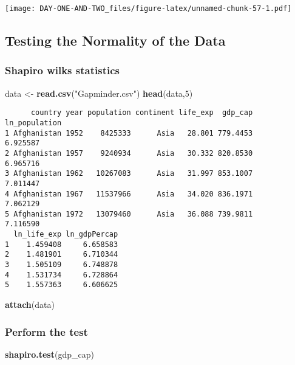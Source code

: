 \documentclass[
]{article}
\newenvironment{Shaded}{\begin{snugshade}}{\end{snugshade}}
\newcommand{\DecValTok}[1]{\textcolor[rgb]{0.00,0.00,0.81}{#1}}
\newcommand{\FunctionTok}[1]{\textcolor[rgb]{0.13,0.29,0.53}{\textbf{#1}}}
\newcommand{\NormalTok}[1]{#1}
\newcommand{\OtherTok}[1]{\textcolor[rgb]{0.56,0.35,0.01}{#1}}
\newcommand{\StringTok}[1]{\textcolor[rgb]{0.31,0.60,0.02}{#1}}
\begin{document}
\texttt{[image: DAY-ONE-AND-TWO\_files/figure-latex/unnamed-chunk-57-1.pdf]}

\hypertarget{testing-the-normality-of-the-data}{%
\subsection{Testing the Normality of the
Data}\label{testing-the-normality-of-the-data}}

\hypertarget{shapiro-wilks-statistics}{%
\subsubsection{Shapiro wilks
statistics}\label{shapiro-wilks-statistics}}

\begin{Shaded}
\begin{Highlighting}[]
\NormalTok{data }\OtherTok{\textless{}{-}} \FunctionTok{read.csv}\NormalTok{(}\StringTok{"Gapminder.csv"}\NormalTok{)}
\FunctionTok{head}\NormalTok{(data,}\DecValTok{5}\NormalTok{)}
\end{Highlighting}
\end{Shaded}

\begin{verbatim}
      country year population continent life_exp  gdp_cap ln_population
1 Afghanistan 1952    8425333      Asia   28.801 779.4453      6.925587
2 Afghanistan 1957    9240934      Asia   30.332 820.8530      6.965716
3 Afghanistan 1962   10267083      Asia   31.997 853.1007      7.011447
4 Afghanistan 1967   11537966      Asia   34.020 836.1971      7.062129
5 Afghanistan 1972   13079460      Asia   36.088 739.9811      7.116590
  ln_life_exp ln_gdpPercap
1    1.459408     6.658583
2    1.481901     6.710344
3    1.505109     6.748878
4    1.531734     6.728864
5    1.557363     6.606625
\end{verbatim}

\begin{Shaded}
\begin{Highlighting}[]
\FunctionTok{attach}\NormalTok{(data)}
\end{Highlighting}
\end{Shaded}

\hypertarget{perform-the-test}{%
\subsubsection{Perform the test}\label{perform-the-test}}

\begin{Shaded}
\begin{Highlighting}[]
\FunctionTok{shapiro.test}\NormalTok{(gdp\_cap)}
\end{Highlighting}
\end{Shaded}
\end{document}
